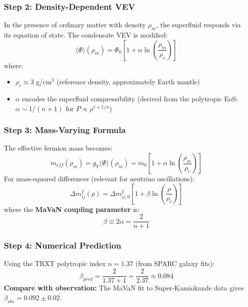 \documentclass[a4paper,12pt]{article}
\begin{document}
\subsubsection{Step 2: Density-Dependent VEV}
In the presence of ordinary matter with density $\rho_m$, the superfluid responds via its equation of state. The condensate VEV is modified:
\begin{equation}
    \langle \Phi \rangle(\rho_m) = \Phi_0 \left[1 + \alpha \ln\left(\frac{\rho_m}{\rho_c}\right)\right]
\end{equation}
where:
\begin{itemize}
    \item $\rho_c \approx 3$ g/cm$^3$ (reference density, approximately Earth mantle)
    \item $\alpha$ encodes the superfluid compressibility (derived from the polytropic EoS: $\alpha \sim 1/(n+1)$ for $P \propto \rho^{1+1/n}$)
\end{itemize}

\subsubsection{Step 3: Mass-Varying Formula}
The effective fermion mass becomes:
\begin{equation}
    m_{eff}(\rho_m) = g_Y \langle \Phi \rangle(\rho_m) = m_0 \left[1 + \alpha \ln\left(\frac{\rho_m}{\rho_c}\right)\right]
\end{equation}
For mass-squared differences (relevant for neutrino oscillations):
\begin{equation}
    \boxed{\Delta m^2_{ij}(\rho) = \Delta m^2_{ij,0} \left[1 + \beta \ln\left(\frac{\rho}{\rho_c}\right)\right]}
\end{equation}
where the \textbf{MaVaN coupling parameter} is:
\begin{equation}
    \beta \equiv 2\alpha = \frac{2}{n+1}
\end{equation}

\subsubsection{Step 4: Numerical Prediction}
Using the TRXT polytropic index $n = 1.37$ (from SPARC galaxy fits):
\begin{equation}
    \beta_{pred} = \frac{2}{1.37 + 1} = \frac{2}{2.37} \approx 0.084
\end{equation}
\textbf{Compare with observation:} The MaVaN fit to Super-Kamiokande data gives $\beta_{obs} = 0.092 \pm 0.02$.
\end{document}
